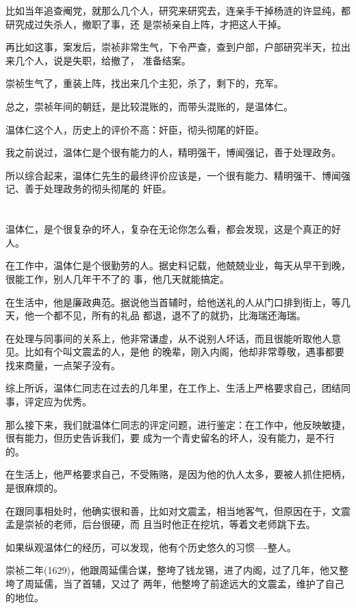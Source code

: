 \documentclass[11pt,a4paper,onecolumn]{article}
\begin{document}
比如当年追查阉党，就那么几个人，研究来研究去，连亲手干掉杨涟的许显纯，都研究成过失杀人，撤职了事，还
是崇祯亲自上阵，才把这人干掉。

再比如这事，案发后，崇祯非常生气，下令严查，查到户部，户部研究半天，拉出来几个人，说是失职，给撤了，
准备结案。

崇祯生气了，重装上阵，找出来几个主犯，杀了，剩下的，充军。

总之，崇祯年间的朝廷，是比较混账的，而带头混账的，是温体仁。

温体仁这个人，历史上的评价不高：奸臣，彻头彻尾的奸臣。

我之前说过，温体仁是个很有能力的人，精明强干，博闻强记，善于处理政务。

所以综合起来，温体仁先生的最终评价应该是，一个很有能力、精明强干、博闻强记、善于处理政务的彻头彻尾的
奸臣。

\section[\thesection]{}

温体仁，是个很复杂的坏人，复杂在无论你怎么看，都会发现，这是个真正的好人。

在工作中，温体仁是个很勤劳的人。据史料记载，他兢兢业业，每天从早干到晚，很能工作，别人几年干不了的
事，他几天就能搞定。

在生活中，他是廉政典范。据说他当首辅时，给他送礼的人从门口排到街上，等几天，他一个都不见，所有的礼品
都退，退不了的就扔，比海瑞还海瑞。

在处理与同事间的关系上，他非常谦虚，从不说别人坏话，而且很能听取他人意见。比如有个叫文震孟的人，是他
的晚辈，刚入内阁，他却非常尊敬，遇事都要找来商量，一点架子没有。

综上所诉，温体仁同志在过去的几年里，在工作上、生活上严格要求自己，团结同事，评定应为优秀。

那么接下来，我们就温体仁同志的评定问题，进行鉴定：在工作中，他反映敏捷，很有能力，但历史告诉我们，要
成为一个青史留名的坏人，没有能力，是不行的。

在生活上，他严格要求自己，不受贿赂，是因为他的仇人太多，要被人抓住把柄，是很麻烦的。

在跟同事相处时，他确实很和善，比如对文震孟，相当地客气，但原因在于，文震孟是崇祯的老师，后台很硬，而
且当时他正在挖坑，等着文老师跳下去。

如果纵观温体仁的经历，可以发现，他有个历史悠久的习惯----整人。

崇祯二年(1629)，他跟周延儒合谋，整垮了钱龙锡，进了内阁，过了几年，他又整垮了周延儒，当了首辅，又过了
两年，他整垮了前途远大的文震孟，维护了自己的地位。
\end{document}

